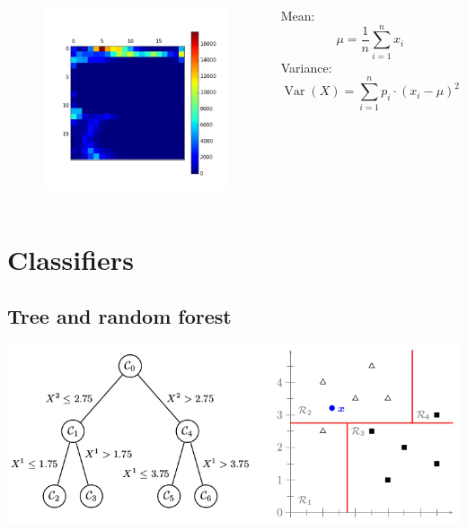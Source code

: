 \documentclass[aspectratio=169]{beamer}
\let\oldsection\section
\renewcommand{\section}[1]{
    \oldsection{#1}	
    \subsection{}
}
\newenvironment{myframe}[1][t]{\begin{frame}[#1]{\secname}{\subsecname}}{\end{frame}}
\begin{document}
    \begin{myframe}
        \begin{columns}
            \centering
            \begin{figure}[h]
                \includegraphics[scale=0.35]{../img/joint_histogram}
            \end{figure}
            
            \centering
            Mean:
            $$ \mu = \frac{1}{n} \sum_{i = 1}^{n} x_i $$
            Variance:
            $$ \operatorname {Var} (X)=\sum _{i=1}^{n}p_{i}\cdot (x_{i}-\mu )^{2} $$
        \end{columns}
    \end{myframe}
    
    \section{Classifiers}
    
    \subsection{Tree and random forest}
    
    \begin{myframe}
        \centering
        \includegraphics[scale=0.55]{../img/decision_tree_simple_example}
    \end{myframe}
    
\end{document}
